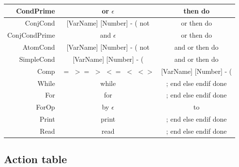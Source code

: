 \documentclass[letterpaper]{article}
\begin{document}
\begin{center}
\begin{tabular}{| r || c | c |}
        CondPrime & or $\epsilon$ & then do \\
        \hline
        ConjCond & [VarName] [Number] - ( not &
        or then do  \\
        \hline
        ConjCondPrime & and $\epsilon$ & or then do\\
        \hline
        AtomCond & [VarName] [Number] - ( not &
        and or then do \\
        \hline
        SimpleCond & [VarName] [Number] - ( &
        and or then do \\
        \hline
        Comp & $=$ $>=$ $>$ $<=$ $<$ $<>$ &
        [VarName] [Number] - ( \\
        \hline
        While & while & ; end else endif done \\
        \hline
        For & for & ; end else endif done \\
        \hline
        ForOp & by $\epsilon$ & to \\
        \hline
        Print & print & ; end else endif done \\
        \hline
        Read & read & ; end else endif done \\
        \hline
    \end{tabular}
\end{center}

\subsection{Action table}
\end{document}
